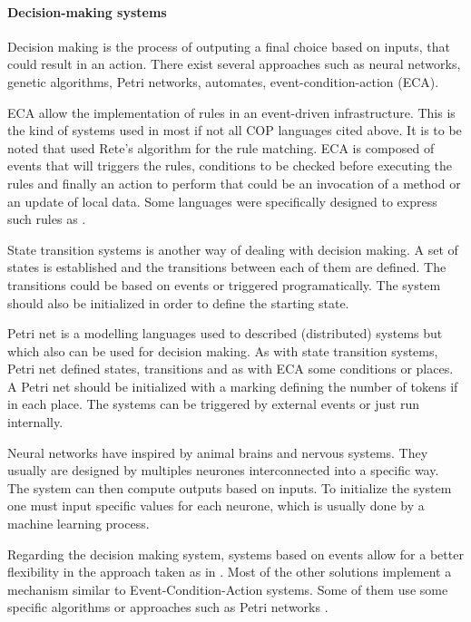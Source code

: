 \documentclass[a4paper]{article}
\begin{document}
\paragraph{Decision-making systems}
Decision making is the process of outputing a final choice based on inputs, that could result in an action. There exist several approaches such as neural networks, genetic algorithms, Petri networks, automates, event-condition-action (ECA).

ECA allow the implementation of rules in an event-driven infrastructure. This is the kind of systems used in most if not all COP languages cited above. It is to be noted that \cite{jayaram_context-oriented_2009} used Rete's algorithm for the rule matching. ECA is composed of events that will triggers the rules, conditions to be checked before executing the rules and finally an action to perform that could be an invocation of a method or an update of local data. Some languages were specifically designed to express such rules as \cite{alferes_event-condition-action_2006}.

State transition systems is another  way of dealing with decision making. A set of states is established and the transitions between each of them are defined. The transitions could be based on events or triggered programatically. The system should also be initialized in order to define the starting state.

Petri net is a modelling languages used to described (distributed) systems but which also can be used for decision making. As with state transition systems, Petri net defined states, transitions and as with ECA some conditions or places. A Petri net should be initialized with a marking defining the number of tokens if in each place. The systems can be triggered by external events or just run internally.

Neural networks have inspired by animal brains and nervous systems. They usually are designed by multiples neurones interconnected into a specific way. The system can then compute outputs based on inputs. To initialize the system one must input specific values for each neurone, which is usually done by a machine learning process.

Regarding the decision making system, systems based on events allow for a better flexibility in the approach taken as in \cite{kamina_eventcj:_2011} \cite{kamina_towards_2009}. Most of the other solutions implement a mechanism similar to Event-Condition-Action systems. Some of them use some specific algorithms \cite{jayaram_context-oriented_2009} or approaches such as Petri networks \cite{cardozo_uniting_2012}.
\end{document}

